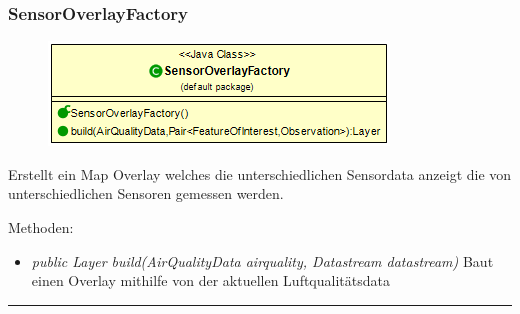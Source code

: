 \subsubsection{SensorOverlayFactory}
\begin{minipage}{0.3\textwidth}
    \begin{figure}[H]
        {\centering\includegraphics[scale = 0.5
        ]{media/view/factory/SensorOverlayFactory_Class.png}}
    \end{figure}
    \end{minipage} \hfill
    \begin{minipage}{0.6\textwidth}
        Erstellt ein Map Overlay welches die unterschiedlichen Sensordata anzeigt die von unterschiedlichen Sensoren gemessen werden.
\end{minipage}
\vspace{\baselineskip}
 Methoden: \begin{itemize} [noitemsep]
    \item \emph{public Layer build(AirQualityData airquality,  Datastream datastream)} Baut einen Overlay mithilfe von der aktuellen Luftqualitätsdata
\end{itemize}

\rule{\textwidth}{0.4pt}
